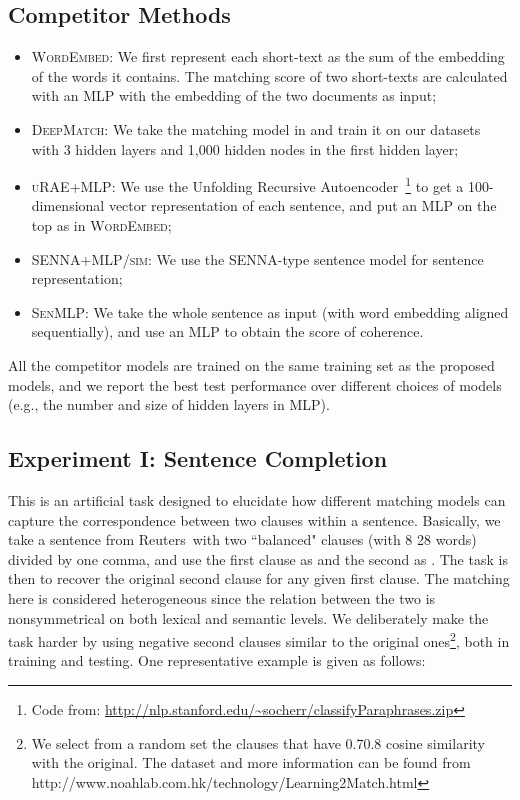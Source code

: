 \documentclass{article} \usepackage{nips14submit_e,times}
\newcommand{\0}{\ensuremath{\mathbf{0}}}
\newcommand{\1}{\ensuremath{\mathbf{1}}}
\begin{document}
\subsection{Competitor Methods}
\begin{itemize}
\item \textsc{WordEmbed:} We first represent each short-text as the sum of the embedding of the words it contains. The matching score of two short-texts are calculated with an MLP with the embedding of the two documents as input; \vspace{-3pt}
\item \textsc{DeepMatch:} We take the matching model in \cite{nipsmatch} and train it on our datasets with 3 hidden layers and 1,000 hidden nodes in the first hidden layer; \vspace{-3pt}
\item \textsc{uRAE+MLP:} We use the Unfolding Recursive Autoencoder~\cite{socher2011}\footnote{Code from: \url{http://nlp.stanford.edu/~socherr/classifyParaphrases.zip}} to get a 100-dimensional vector representation of each sentence, and put an MLP on the top as in \textsc{WordEmbed}; \vspace{-3pt}
\item \textsc{SENNA+MLP/sim:} We use the SENNA-type sentence model for sentence representation;\vspace{-3pt}
\item \textsc{SenMLP:} We take the whole sentence as input (with word embedding aligned sequentially), and use an MLP to obtain the score of coherence. \vspace{-3pt}
\end{itemize}
All the competitor models are trained on the same training set as the proposed models, and we report the best test performance over different choices of models (e.g., the number and size of hidden layers in MLP).


\subsection{Experiment I: Sentence Completion} \label{s:expt1} \vspace{-10pt}
This is an artificial task designed to elucidate how different matching models can capture the correspondence between two clauses within a sentence.
Basically, we take a sentence from Reuters~\cite{rcv1}with two ``balanced" clauses (with 8 28 words) divided by one comma, and use the first clause as  and the second as . The task is then to recover the original second clause for any given first clause. The matching here is considered  heterogeneous since the relation between the two is nonsymmetrical on both lexical and semantic levels.
We deliberately make the task harder by using negative second clauses similar to the original ones\footnote{We select from a random set the clauses that have 0.70.8 cosine similarity with the original. The dataset and more information can be found from http://www.noahlab.com.hk/technology/Learning2Match.html}, both in training and testing. One representative example is given as follows:
\end{document}
